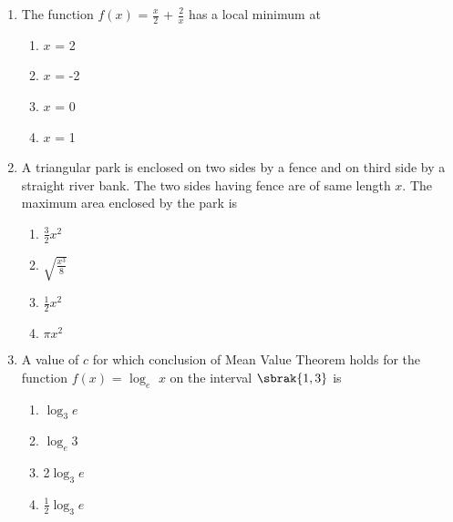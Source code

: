 \documentclass[journal,12pt,onecolumn]{IEEEtran}
\theoremstyle{remark}
\begin{document}
\begin{enumerate}
\begin{enumerate}
        \end{enumerate}
        
            
        \item The function $f(x)$ = $\frac{x}{2}$ + $\frac{2}{x}$ has a local minimum at \hfill{}
         \begin{multicols}{4}
        \begin{enumerate}
        
            
        
         \item $x$ = 2
        \item $x$ = -2
        \item $x$ = 0
        \item $x$ = 1
        
            
        \end{enumerate}
        \end{multicols}
            
        \item A triangular park is enclosed on two sides by a fence and on third side by a straight river bank. The two sides having fence are of same length $x$.  The maximum area enclosed by the park is \hfill{}
         \begin{multicols}{4}
        \begin{enumerate}
        
            
        
            \item $\frac{3}{2}$$x^2$
        \item $\sqrt{\frac{x^3}{8}}$
        \item $\frac{1}{2}$$x^2$
        \item $\pi$$x^2$
    
        \end{enumerate}
        \end{multicols}
            
        \item A value of $c$ for which conclusion of Mean Value Theorem holds for the function $f(x)$ = $\log_e$ $x$ on the interval $\sbrak{1,3}$ is \hfill{}
         \begin{multicols}{4}
        \begin{enumerate}
        
            
        
            \item $\log_3$$e$
        \item $\log_e$3
        \item 2$\log_3$$e$
        \item $\frac{1}{2}$$\log_3$$e$


\end{enumerate}
\end{multicols}
\end{enumerate}
\end{document}
